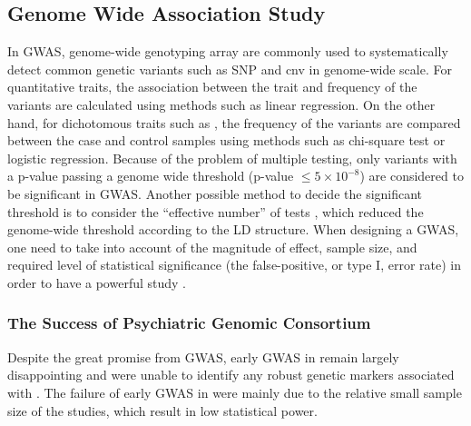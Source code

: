 	\subsection{Genome Wide Association Study}
	In \gls{GWAS}, genome-wide genotyping array are commonly used to systematically detect common genetic variants such as \gls{SNP} and \gls{cnv} in genome-wide scale.
	For quantitative traits, the association between the trait and frequency of the variants are calculated using methods such as linear regression.
	On the other hand, for dichotomous traits such as , the frequency of the variants are compared between the case and control samples using methods such as chi-square test or logistic regression.
	Because of the problem of multiple testing, only variants with a p-value passing a genome wide threshold (p-value $\le5\times10^{-8}$) are considered to be significant in \gls{GWAS}.
	Another possible method to decide the significant threshold is to consider the ``effective number'' of tests \citep{Li2011}, which reduced the genome-wide threshold according to the \gls{LD} structure.
	When designing a \gls{GWAS}, one need to take into account of the magnitude of effect, sample size, and required level of statistical significance (the false-positive, or type I, error rate) in order to have a powerful study \citep{Purcell2003}.
	
	\subsubsection{The Success of Psychiatric Genomic Consortium} 
	Despite the great promise from \gls{GWAS}, early \gls{GWAS} in  remain largely disappointing and were unable to identify any robust genetic markers associated with .
	The failure of early \gls{GWAS} in  were mainly due to the relative small sample size of the studies, which result in low statistical power.
	
